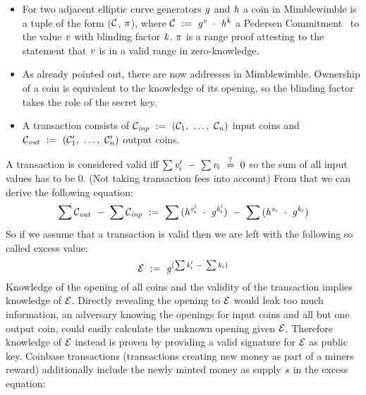 \begin{itemize}
    \item For two adjacent elliptic curve generators $\mathit{g}$ and $\mathit{h}$ a coin in Mimblewimble is a tuple of the form ($\mathcal{C}$, $\pi$), where $\mathcal{C} ~:=~ \mathit{g}^{\mathit{v}} ~\cdot~ \mathit{h}^{\mathit{k}}$  a Pedersen Commitment~\cite{pedersen1991non}
    to the value $\mathit{v}$ with blinding factor $\mathit{k}$. $\pi$ is a range proof attesting to the statement that $\mathit{v}$ is in a valid range  in zero-knowledge.
    
    \item As already pointed out, there are now addresses in Mimblewimble. Ownership of a coin is equivalent to the knowledge of its opening, so the blinding factor takes the role of the secret key.
    
    \item A transaction consists of $\mathcal{C}_{\mathit{inp}} ~:=~ (\mathcal{C}_1 ,~ \dots ,~ \mathcal{C}_n)$ input coins and $\mathcal{C}_{\mathit{out}} ~:=~ (\mathcal{C}'_1 ,~ \dots ,~ \mathcal{C}'_n)$ output coins.
\end{itemize}
A transaction is considered valid iff $\sum{\mathit{v}'_i} ~-~ \sum{\mathit{v}_i} ~\stackrel{?}{=}~ 0$ so the sum of all input values has to be 0. (Not taking transaction fees into account) 
From that we can derive the following equation:
\[ \sum{\mathcal{C}_{\mathit{out}}} ~-~ \sum{\mathcal{C}_{\mathit{inp}}} ~:=~ \sum{(\mathit{h}^{\mathit{v}'_i} ~\cdot~\mathit{g}^{\mathit{k}'_i})} ~-~ \sum{(\mathit{h}^{\mathit{v}_i} ~\cdot~\mathit{g}^{\mathit{k}_i})} \]
So if we assume that a transaction is valid then we are left with the following so called excess value:
\[ \mathcal{E} ~:=~ \mathit{g}^{(\sum{\mathit{k}'_i} ~-~ \sum{\mathit{k}_i})} \]
Knowledge of the opening of all coins and the validity of the transaction implies knowledge of $\mathcal{E}$.  
Directly revealing the opening to $\mathcal{E}$ would leak too much information, an adversary knowing the openings for input coins and all but one output coin, could easily calculate the unknown opening given $\mathcal{E}$.
Therefore knowledge of $\mathcal{E}$ instead is proven by providing a valid signature for $\mathcal{E}$ as public key.
Coinbase transactions (transactions creating new money as part of a miners reward) additionally include the newly minted money as supply $\mathit{s}$ in the excess equation:
